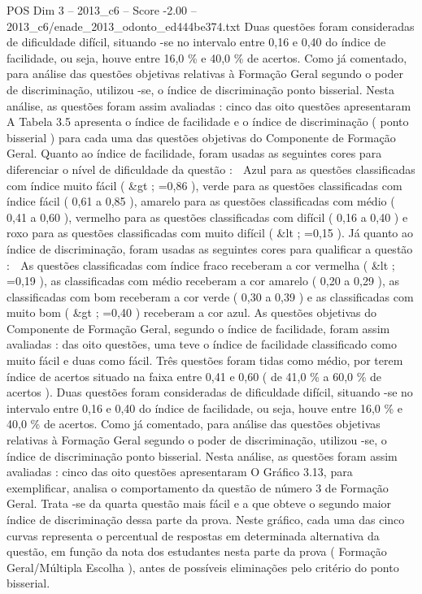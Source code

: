 \begin{textsample}{POS Dim 3 – 2013\_c6 – Score -2.00 – 2013\_c6/enade\_2013\_odonto\_ed444be374.txt}
Duas questões foram consideradas de dificuldade difícil, situando -se no intervalo entre 0,16 e 0,40 do índice de facilidade, ou seja, houve entre 16,0 \% e 40,0 \% de acertos.
Como já comentado, para análise das questões objetivas relativas à Formação Geral segundo o poder de discriminação, utilizou -se, o índice de discriminação ponto bisserial.
Nesta análise, as questões foram assim avaliadas : cinco das oito questões apresentaram A Tabela 3.5 apresenta o índice de facilidade e o índice de discriminação ( ponto bisserial ) para cada uma das questões objetivas do Componente de Formação Geral.
Quanto ao índice de facilidade, foram usadas as seguintes cores para diferenciar o nível de dificuldade da questão :  Azul para as questões classificadas com índice muito fácil ( \&gt ; =0,86 ), verde para as questões classificadas com índice fácil ( 0,61 a 0,85 ), amarelo para as questões classificadas com médio ( 0,41 a 0,60 ), vermelho para as questões classificadas com difícil ( 0,16 a 0,40 ) e roxo para as questões classificadas com muito difícil ( \&lt ; =0,15 ).
Já quanto ao índice de discriminação, foram usadas as seguintes cores para qualificar a questão :  As questões classificadas com índice fraco receberam a cor vermelha ( \&lt ; =0,19 ), as classificadas com médio receberam a cor amarelo ( 0,20 a 0,29 ), as classificadas com bom receberam a cor verde ( 0,30 a 0,39 ) e as classificadas com muito bom ( \&gt ; =0,40 ) receberam a cor azul.
As questões objetivas do Componente de Formação Geral, segundo o índice de facilidade, foram assim avaliadas : das oito questões, uma teve o índice de facilidade classificado como muito fácil e duas como fácil.
Três questões foram tidas como médio, por terem índice de acertos situado na faixa entre 0,41 e 0,60 ( de 41,0 \% a 60,0 \% de acertos ).
Duas questões foram consideradas de dificuldade difícil, situando -se no intervalo entre 0,16 e 0,40 do índice de facilidade, ou seja, houve entre 16,0 \% e 40,0 \% de acertos.
Como já comentado, para análise das questões objetivas relativas à Formação Geral segundo o poder de discriminação, utilizou -se, o índice de discriminação ponto bisserial.
Nesta análise, as questões foram assim avaliadas : cinco das oito questões apresentaram O Gráfico 3.13, para exemplificar, analisa o comportamento da questão de número 3 de Formação Geral.
Trata -se da quarta questão mais fácil e a que obteve o segundo maior índice de discriminação dessa parte da prova.
Neste gráfico, cada uma das cinco curvas representa o percentual de respostas em determinada alternativa da questão, em função da nota dos estudantes nesta parte da prova ( Formação Geral/Múltipla Escolha ), antes de possíveis eliminações pelo critério do ponto bisserial.

\end{textsample}
